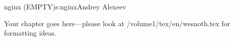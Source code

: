 \begin{aosachapter}{nginx (EMPTY)}{s:nginx}{Andrey Alexeev}

Your chapter goes here---please look at /volume1/tex/en/wesnoth.tex for 
formatting ideas.

\end{aosachapter}
